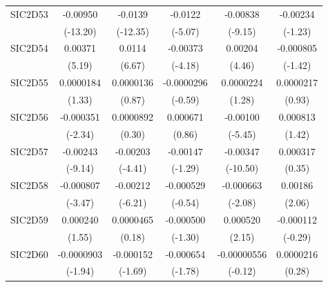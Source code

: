 \begin{table}[htbp]
\begin{tabular}{l*{5}{c}}
SIC2D53     &    -0.00950\sym{***}&     -0.0139\sym{***}&     -0.0122\sym{***}&    -0.00838\sym{***}&    -0.00234         \\
            &    (-13.20)         &    (-12.35)         &     (-5.07)         &     (-9.15)         &     (-1.23)         \\
SIC2D54     &     0.00371\sym{***}&      0.0114\sym{***}&    -0.00373\sym{***}&     0.00204\sym{***}&   -0.000805         \\
            &      (5.19)         &      (6.67)         &     (-4.18)         &      (4.46)         &     (-1.42)         \\
SIC2D55     &   0.0000184         &   0.0000136         &  -0.0000296         &   0.0000224         &   0.0000217         \\
            &      (1.33)         &      (0.87)         &     (-0.59)         &      (1.28)         &      (0.93)         \\
SIC2D56     &   -0.000351\sym{*}  &   0.0000892         &    0.000671         &    -0.00100\sym{***}&    0.000813         \\
            &     (-2.34)         &      (0.30)         &      (0.86)         &     (-5.45)         &      (1.42)         \\
SIC2D57     &    -0.00243\sym{***}&    -0.00203\sym{***}&    -0.00147         &    -0.00347\sym{***}&    0.000317         \\
            &     (-9.14)         &     (-4.41)         &     (-1.29)         &    (-10.50)         &      (0.35)         \\
SIC2D58     &   -0.000807\sym{***}&    -0.00212\sym{***}&   -0.000529         &   -0.000663\sym{*}  &     0.00186\sym{*}  \\
            &     (-3.47)         &     (-6.21)         &     (-0.54)         &     (-2.08)         &      (2.06)         \\
SIC2D59     &    0.000240         &   0.0000465         &   -0.000500         &    0.000520\sym{*}  &   -0.000112         \\
            &      (1.55)         &      (0.18)         &     (-1.30)         &      (2.15)         &     (-0.29)         \\
SIC2D60     &  -0.0000903         &   -0.000152         &   -0.000654         & -0.00000556         &   0.0000216         \\
            &     (-1.94)         &     (-1.69)         &     (-1.78)         &     (-0.12)         &      (0.28)         \\

\end{tabular}
\end{table}
